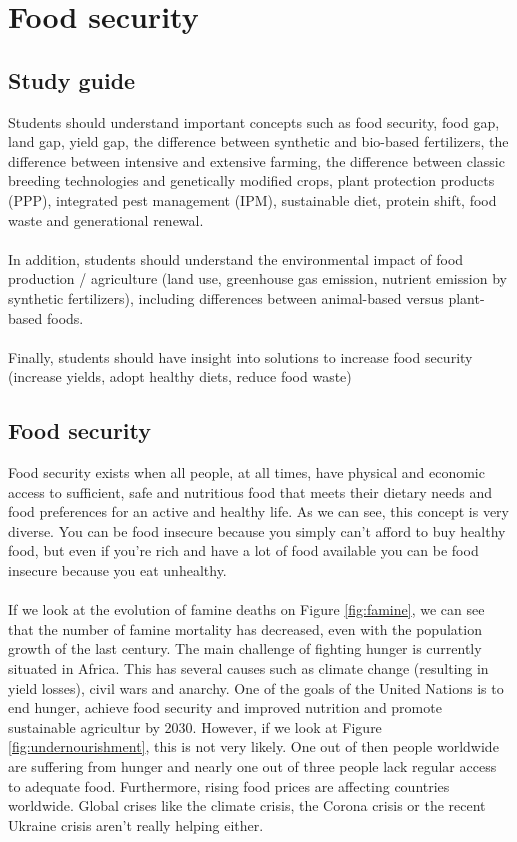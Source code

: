 \documentclass[../summary.tex]{subfiles}
\begin{document}
	
	\section{Food security}
	
	\subsection{Study guide}
	
	Students should understand important concepts such as food security, food gap, land gap, yield gap, the difference between synthetic and bio-based fertilizers, the difference between intensive and extensive farming, the difference between classic breeding technologies and genetically modified crops, plant protection products (PPP), integrated pest management (IPM), sustainable diet, protein shift, food waste and generational renewal.
	\\\\
	In addition, students should understand the environmental impact of food production / agriculture (land use, greenhouse gas emission, nutrient emission by synthetic fertilizers), including differences between animal-based versus plant-based foods.
	\\\\
	Finally, students should have insight into solutions to increase food security (increase yields, adopt healthy
	diets, reduce food waste)
	
	\subsection{Food security}
	
	Food security exists when all people, at all times, have physical and economic access to sufficient, safe and nutritious food that meets their dietary needs and food preferences for an active and healthy life. As we can see, this concept is very diverse. You can be food insecure because you simply can't afford to buy healthy food, but even if you're rich and have a lot of food available you can be food insecure because you eat unhealthy. 
	\\\\
	If we look at the evolution of famine deaths on Figure \ref{fig:famine}, we can see that the number of famine mortality has decreased, even with the population growth of the last century. The main challenge of fighting hunger is currently situated in Africa. This has several causes such as climate change (resulting in yield losses), civil wars and anarchy. One of the goals of the United Nations is to end hunger, achieve food security and improved nutrition and promote sustainable agricultur by 2030. However, if we look at Figure \ref{fig:undernourishment}, this is not very likely. One out of then people worldwide are suffering from hunger and nearly one out of three people lack regular access to adequate food. Furthermore, rising food prices are affecting countries worldwide. Global crises like the climate crisis, the Corona crisis or the recent Ukraine crisis aren't really helping either.
	
\end{document}
